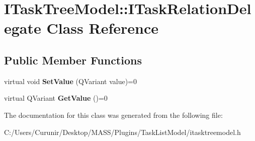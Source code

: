\hypertarget{class_i_task_tree_model_1_1_i_task_relation_delegate}{}\section{I\+Task\+Tree\+Model\+:\+:I\+Task\+Relation\+Delegate Class Reference}
\label{class_i_task_tree_model_1_1_i_task_relation_delegate}
\subsection*{Public Member Functions}
\begin{DoxyCompactItemize}
\item 
\mbox{\label{class_i_task_tree_model_1_1_i_task_relation_delegate_ab13bf8d76da4ca5e9925a7af7827a994}} 
virtual void {\bfseries Set\+Value} (Q\+Variant value)=0
\item 
\mbox{\label{class_i_task_tree_model_1_1_i_task_relation_delegate_a1a720d6d7ca9a7aeaf9b182326152d17}} 
virtual Q\+Variant {\bfseries Get\+Value} ()=0
\end{DoxyCompactItemize}


The documentation for this class was generated from the following file\+:\begin{DoxyCompactItemize}
\item 
C\+:/\+Users/\+Curunir/\+Desktop/\+M\+A\+S\+S/\+Plugins/\+Task\+List\+Model/itasktreemodel.\+h\end{DoxyCompactItemize}
